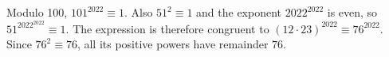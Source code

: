 Modulo 100, $101^{2022}\equiv1$. Also $51^2\equiv1$ and the exponent $2022^{2022}$ is even, so $51^{2022^{2022}}\equiv1$. The expression is therefore congruent to $(12\cdot23)^{2022}\equiv76^{2022}$. Since $76^2\equiv76$, all its positive powers have remainder $\boxed{76}$.

